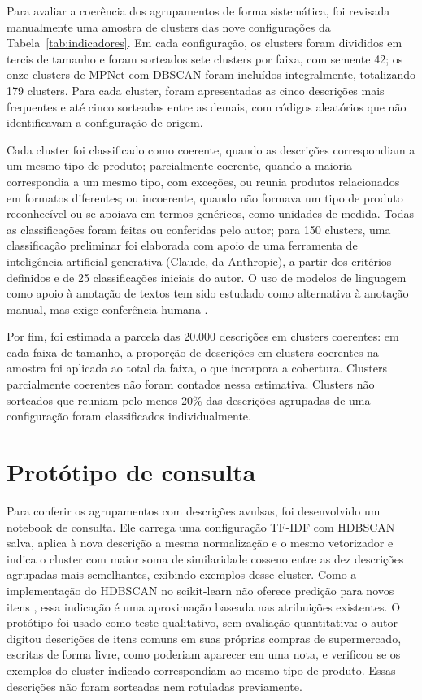 \documentclass[english,brazilian]{UNISINOSmonografia}
\begin{document}
Para avaliar a coerência dos agrupamentos de forma sistemática, foi revisada manualmente uma amostra de clusters das nove configurações da Tabela~\ref{tab:indicadores}. Em cada configuração, os clusters foram divididos em tercis de tamanho e foram sorteados sete clusters por faixa, com semente 42; os onze clusters de MPNet com DBSCAN foram incluídos integralmente, totalizando 179 clusters. Para cada cluster, foram apresentadas as cinco descrições mais frequentes e até cinco sorteadas entre as demais, com códigos aleatórios que não identificavam a configuração de origem.

Cada cluster foi classificado como coerente, quando as descrições correspondiam a um mesmo tipo de produto; parcialmente coerente, quando a maioria correspondia a um mesmo tipo, com exceções, ou reunia produtos relacionados em formatos diferentes; ou incoerente, quando não formava um tipo de produto reconhecível ou se apoiava em termos genéricos, como unidades de medida. Todas as classificações foram feitas ou conferidas pelo autor; para 150 clusters, uma classificação preliminar foi elaborada com apoio de uma ferramenta de inteligência artificial generativa (Claude, da Anthropic), a partir dos critérios definidos e de 25 classificações iniciais do autor. O uso de modelos de linguagem como apoio à anotação de textos tem sido estudado como alternativa à anotação manual, mas exige conferência humana \cite{gilardi2023chatgpt}.

Por fim, foi estimada a parcela das 20.000 descrições em clusters coerentes: em cada faixa de tamanho, a proporção de descrições em clusters coerentes na amostra foi aplicada ao total da faixa, o que incorpora a cobertura. Clusters parcialmente coerentes não foram contados nessa estimativa. Clusters não sorteados que reuniam pelo menos 20\% das descrições agrupadas de uma configuração foram classificados individualmente.

\section{Protótipo de consulta}
\label{sec:prototipo}

Para conferir os agrupamentos com descrições avulsas, foi desenvolvido um notebook de consulta. Ele carrega uma configuração TF-IDF com HDBSCAN salva, aplica à nova descrição a mesma normalização e o mesmo vetorizador e indica o cluster com maior soma de similaridade cosseno entre as dez descrições agrupadas mais semelhantes, exibindo exemplos desse cluster. Como a implementação do HDBSCAN no scikit-learn não oferece predição para novos itens \cite{sklearn-hdbscan}, essa indicação é uma aproximação baseada nas atribuições existentes. O protótipo foi usado como teste qualitativo, sem avaliação quantitativa: o autor digitou descrições de itens comuns em suas próprias compras de supermercado, escritas de forma livre, como poderiam aparecer em uma nota, e verificou se os exemplos do cluster indicado correspondiam ao mesmo tipo de produto. Essas descrições não foram sorteadas nem rotuladas previamente.
\end{document}
